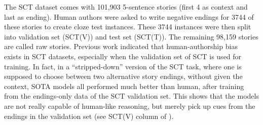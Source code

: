 
The SCT dataset comes with 101,903 5-sentence stories (first 4 as context and last as ending).
Human authors were asked to write negative endings for 3744 of these stories to create
cloze test instances. These 3744 instances were then split into validation set (SCT(V))
and test set (SCT(T)). The remaining 98,159 stories are called raw stories.
Previous work indicated that human-authorship bias~\cite{sharma2018tackling} exists
in SCT datasets, especially when the validation set of SCT is used for training.
In fact, in a ``stripped-down'' version of the SCT task, where one is supposed to choose
between two alternative story endings, without given the context, 
SOTA models all performed much better than human, after training from the endings-only data of
the SCT validation set. This shows that the models are not really capable of human-like reasoning,
but merely pick up cues from the endings in the validation set (see SCT(V) column of ). 

